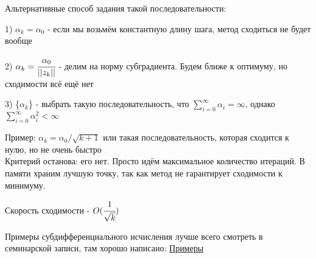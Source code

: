 Альтернативные способ задания такой последовательности:

1) $\alpha_k = \alpha_0$ - если мы возьмём константную длину шага, метод сходиться не будет вообще

2) $\alpha_k = \cfrac{\alpha_0}{||z_k||}$ - делим на норму субградиента. Будем ближе к оптимуму, но сходимости всё ещё нет

3) \{$\alpha_k$\} - выбрать такую последовательность, что $\sum_{i = 0}^{\infty} \alpha_i = \infty$, однако $\sum_{i = 0}^{\infty} \alpha_i^2 < \infty$

Пример: $\alpha_k = \alpha_0 / \sqrt{k + 1}$ или такая последовательность, которая сходится к нулю, но не очень быстро \\

Критерий останова: его нет. Просто идём максимальное количество итераций. В памяти храним лучшую точку, так как метод не гарантирует сходимости к минимуму.

Скорость сходимости - $O(\cfrac{1}{\sqrt{k}})$

Примеры субдифференциального исчисления лучше всего смотреть в семинарской записи, там хорошо написано: \href{https://drive.google.com/file/d/175GWh8qsMg6rVO_xkjDvWbmRG_ALzIbm/view}{Примеры}
